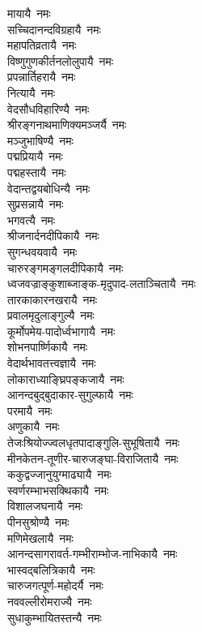 \begin{multicols}{2}
\begin{flushleft}
मायायै~नमः\hfill{}\\
सच्चिदानन्दविग्रहायै~नमः\\
महापतिव्रतायै~नमः\\
विष्णुगुणकीर्तनलोलुपायै~नमः\\
प्रपन्नार्तिहरायै~नमः\\
नित्यायै~नमः\\
वेदसौधविहारिण्यै~नमः\\
श्रीरङ्गनाथमाणिक्यमञ्जर्यै~नमः\\
मञ्जुभाषिण्यै~नमः\\
पद्मप्रियायै~नमः\\
पद्महस्तायै~नमः\hfill{}\\
वेदान्तद्वयबोधिन्यै~नमः\\
सुप्रसन्नायै~नमः\\
भगवत्यै~नमः\\
श्रीजनार्दनदीपिकायै~नमः\\
सुगन्धवयवायै~नमः\\
चारुरङ्गमङ्गलदीपिकायै~नमः\\
ध्वजवज्राङ्कुशाब्जाङ्क-मृदुपाद-लताञ्चितायै~नमः\\
तारकाकारनखरायै~नमः\\
प्रवालमृदुलाङ्गुल्यै~नमः\\
कूर्मोपमेय-पादोर्ध्वभागायै~नमः\hfill{}\\
शोभनपार्ष्णिकायै~नमः\\
वेदार्थभावतत्त्वज्ञायै~नमः\\
लोकाराध्याङ्घ्रिपङ्कजायै~नमः\\
आनन्दबुद्बुदाकार-सुगुल्फायै~नमः\\
परमायै~नमः\\
अणुकायै~नमः\\
तेजःश्रियोज्ज्वलधृतपादाङ्गुलि-सुभूषितायै~नमः\\
मीनकेतन-तूणीर-चारुजङ्घा-विराजितायै~नमः\\
ककुद्वज्जानुयुग्माढ्यायै~नमः\\
स्वर्णरम्भाभसक्थिकायै~नमः\hfill{}\\
विशालजघनायै~नमः\\
पीनसुश्रोण्यै~नमः\\
मणिमेखलायै~नमः\\
आनन्दसागरावर्त-गम्भीराम्भोज-नाभिकायै~नमः\\
भास्वद्बलित्रिकायै~नमः\\
चारुजगत्पूर्ण-महोदर्यै~नमः\\
नववल्लीरोमराज्यै~नमः\\
सुधाकुम्भायितस्तन्यै~नमः\\

\end{flushleft}
\end{multicols}
